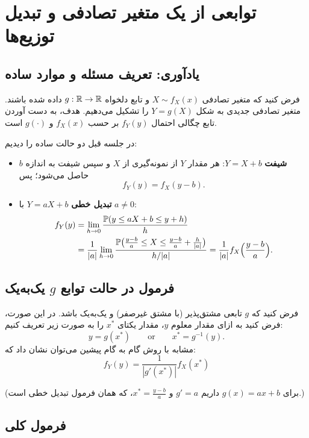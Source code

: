 \chapter{توابعی از یک متغیر تصادفی و تبدیل توزیع‌ها}

\section{یادآوری: تعریف مسئله و موارد ساده}

فرض کنید که متغیر تصادفی $X\sim f_X(x)$ و تابع دلخواه $g:\mathbb{R}\to\mathbb{R}$ داده شده باشند. متغیر تصادفی جدیدی به شکل $Y=g(X)$ را تشکیل می‌دهیم. هدف، به دست آوردن \textcolor{red!70!black}{تابع چگالی احتمال $f_Y(y)$} بر حسب $f_X(x)$ و $g(\cdot)$ است.

در جلسه قبل دو حالت ساده را دیدیم:
\begin{itemize}
\item \textbf{شیفت} $Y=X+b$: هر مقدار $Y$ از نمونه‌گیری از $X$ و سپس شیفت به اندازه $b$ حاصل می‌شود؛ پس
\[f_Y(y)=f_X(y-b).\]
\item \textbf{تبدیل خطی} $Y=aX+b$ با $a\ne0$:
\[
\begin{aligned}
f_Y(y)&=\lim_{h\to0}\frac{\mathbb{P}(y\le aX+b\le y+h)}{h}\\
&=\frac{1}{|a|}\lim_{h\to0}\frac{\mathbb{P}\big(\frac{y-b}{a}\le X\le\frac{y-b}{a}+\frac{h}{|a|}\big)}{h/|a|}=\frac{1}{|a|}f_X\Big(\frac{y-b}{a}\Big).
\end{aligned}
\]
\end{itemize}

\section{فرمول در حالت توابع $g$ یک‌به‌یک}

\begin{theorem}[تبدیل یک‌به‌یک]
فرض کنید که $g$ تابعی مشتق‌پذیر (با مشتق غیرصفر) و یک‌به‌یک باشد. در این صورت، فرض کنید به ازای مقدار معلوم $y$، مقدار یکتای $x^*$ را به صورت زیر تعریف کنیم:
\[
y=g(x^*)\qquad\text{or}\qquad x^*=g^{-1}(y).
\]
مشابه با روش گام به گام پیشین می‌توان نشان داد که:
\[
\boxed{\ f_Y(y)=\frac{1}{|g'(x^*)|}f_X(x^*)\ }
\]
\end{theorem}
(برای $g(x)=ax+b$ داریم $g'=a$ و $x^*=\frac{y-b}{a}$، که همان فرمول تبدیل خطی است.)

\section{فرمول کلی}

